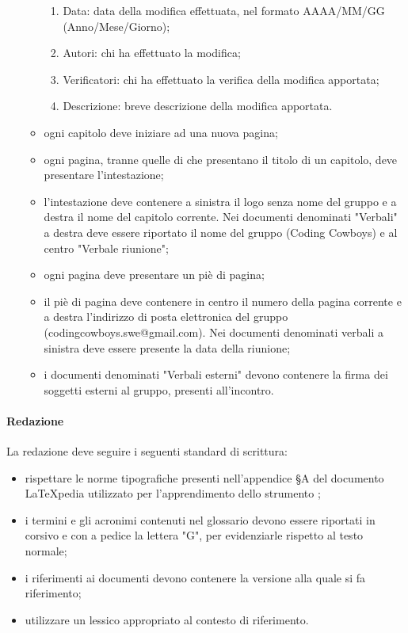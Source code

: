\begin{enumerate}
\begin{itemize}
\begin{enumerate}
            \item Data: data della modifica effettuata, nel formato AAAA/MM/GG (Anno/Mese/Giorno);
            \item Autori: chi ha effettuato la modifica;
            \item Verificatori: chi ha effettuato la verifica della modifica apportata;
            \item Descrizione: breve descrizione della modifica apportata.
        \end{enumerate}
        \item ogni capitolo deve iniziare ad una nuova pagina;
        \item ogni pagina, tranne quelle di che presentano il titolo di un capitolo, deve presentare l'intestazione;
        \item l'intestazione deve contenere a sinistra il logo senza nome del gruppo e a destra il nome del capitolo corrente. Nei documenti denominati "Verbali" a destra deve essere riportato il nome del gruppo (Coding Cowboys) e al centro "Verbale riunione";
        \item ogni pagina deve presentare un piè di pagina;
        \item il piè di pagina deve contenere in centro il numero della pagina corrente e a destra l'indirizzo di posta elettronica del gruppo (codingcowboys.swe@gmail.com). Nei documenti denominati verbali a sinistra deve essere presente la data della riunione;
        \item i documenti denominati "Verbali esterni" devono contenere la firma dei soggetti esterni al gruppo, presenti all'incontro.
    \end{itemize}
\end{enumerate}

\paragraph{Redazione}
La redazione deve seguire i seguenti standard di scrittura:
\begin{itemize}
    \item rispettare le norme tipografiche presenti nell'appendice §A del documento LaTeXpedia utilizzato per l'apprendimento dello strumento \ccgloss{\LaTeX};
    \item i termini e gli acronimi contenuti nel glossario devono essere riportati in corsivo e con a pedice la lettera "G", per evidenziarle rispetto al testo normale;
    \item i riferimenti ai documenti devono contenere la versione alla quale si fa riferimento;
    \item utilizzare un lessico appropriato al contesto di riferimento.
\end{itemize}

